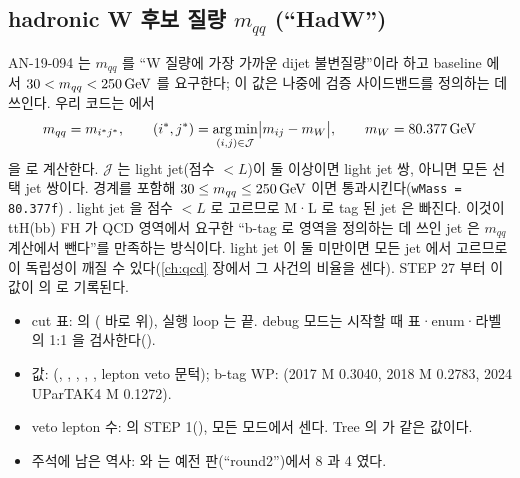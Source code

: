 \subsection{hadronic W 후보 질량 $m_{qq}$ (``HadW'')}\label{sec:selection-mqq}
AN-19-094 는 $m_{qq}$ 를 ``W 질량에 가장 가까운 dijet 불변질량''이라 하고 baseline 에서 $30<m_{qq}<250\,\mathrm{GeV}$ 를 요구한다; 이 값은 나중에 검증
사이드밴드를 정의하는 데 쓰인다. 우리 코드는  에서
\begin{equation}
m_{qq}=m_{i^*j^*},\qquad (i^*,j^*)=\operatorname*{arg\,min}_{(i,j)\in\mathcal{J}}\bigl|m_{ij}-m_W\bigr|,\qquad m_W=80.377\,\mathrm{GeV}
\label{eq:selection-mqq}
\end{equation}
을  로 계산한다. $\mathcal{J}$ 는 light jet(점수 $<L$)이 둘 이상이면 light jet 쌍, 아니면 모든 선택 jet 쌍이다.
경계를 포함해 $30\le m_{qq}\le250\,\mathrm{GeV}$ 이면 통과시킨다(\texttt{wMass = 80.377f})
. light jet 을 점수 $<L$ 로 고르므로 M·L 로 tag 된 jet 은 빠진다. 이것이 ttH(bb) FH 가 QCD 영역에서
요구한 ``b-tag 로 영역을 정의하는 데 쓰인 jet 은 $m_{qq}$ 계산에서 뺀다''를 만족하는 방식이다.
light jet 이 둘 미만이면 모든 jet 에서 고르므로 이 독립성이 깨질 수 있다(\ref{ch:qcd} 장에서 그 사건의 비율을 센다). STEP 27 부터 이 값이
 의  로 기록된다.

\begin{impl}
\begin{itemize}
\item cut 표:  의 ( 바로 위), 실행 loop 는  끝.
      debug 모드는 시작할 때 표·enum·라벨의 1:1 을 검사한다(\code{[dbg][seltable]}).
\item 값: (, , , , ,
      lepton veto 문턱); b-tag WP: (2017 M 0.3040, 2018 M 0.2783, 2024 UParTAK4 M 0.1272).
\item veto lepton 수:  의 STEP 1(), 모든 모드에서 센다. Tree 의  가 같은 값이다.
\item 주석에 남은 역사:  와  는 예전 판(``round2'')에서 8 과 4 였다.
\end{itemize}
\end{impl}

